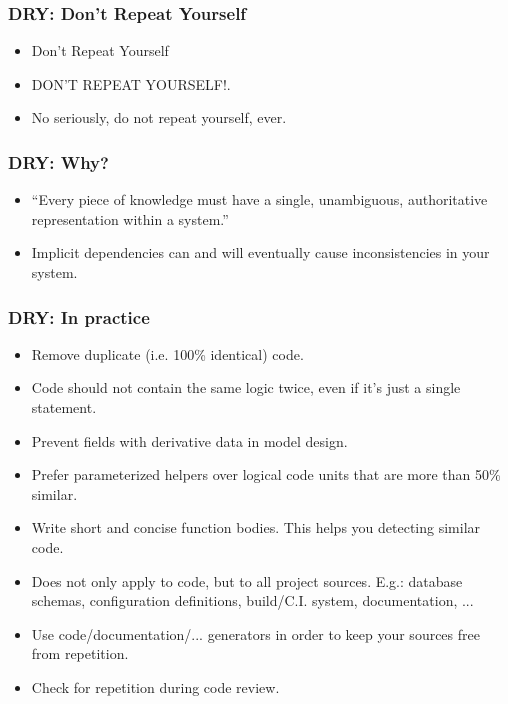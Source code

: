 \begin{frame}
	\frametitle{DRY: Don't Repeat Yourself}
	\begin{itemize}[<+-| highlight@+>]
		\item Don't Repeat Yourself
		\item DON'T REPEAT YOURSELF!.
		\item No seriously, do not repeat yourself, ever.
	\end{itemize}
\end{frame}


\begin{frame}
	\frametitle{DRY: Why?}
	\begin{itemize}[<+-| highlight@+>]
		\item ``Every piece of knowledge must have a single, unambiguous, authoritative representation within a system.''
		\item Implicit dependencies can and will eventually cause inconsistencies in your system.
	\end{itemize}
\end{frame}


\begin{frame}
	\frametitle{DRY: In practice}
	\begin{itemize}[<+-| highlight@+>]
		\item Remove duplicate (i.e. 100\% identical) code.
		\item Code should not contain the same logic twice, even if it's just a single statement.
		\item Prevent fields with derivative data in model design.
		\item Prefer parameterized helpers over logical code units that are more than 50\% similar.
		\item Write short and concise function bodies. This helps you detecting similar code.
		\item Does not only apply to code, but to all project sources. E.g.: database schemas, configuration definitions, build/C.I. system, documentation, ...
		\item Use code/documentation/... generators in order to keep your sources free from repetition.
		\item Check for repetition during code review.
	\end{itemize}
\end{frame}

